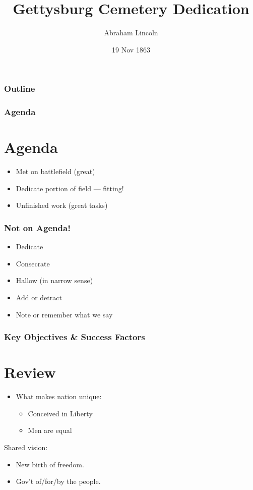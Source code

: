 \documentclass{beamer}
\title{Gettysburg Cemetery Dedication}
\author{Abraham Lincoln}
\institute{United States of America}
\date{19 Nov 1863}
\begin{document}
\begin{frame}
\maketitle
\end{frame}

\begin{frame}
\frametitle{Outline}
\tableofcontents
\end{frame}


\begin{frame}
\frametitle{Agenda}
\section{Agenda}
\begin{itemize}
\item Met on battlefield (great)
\item Dedicate portion of field --- fitting!
\item Unfinished work (great tasks)
\end{itemize}
\end{frame}



\begin{frame}
\frametitle{Not on Agenda!}
\begin{itemize}
\item Dedicate
\item \pause Consecrate
\item \pause Hallow (in narrow sense)
\item \pause Add or detract
\item\pause  Note or remember what we say
\end{itemize}
\end{frame}



\begin{frame}
\frametitle{Key Objectives \& Success Factors}
\section{Review}
\begin{itemize}
\item What makes nation unique:
	\begin{itemize}
	\item Conceived in Liberty
	\item Men are equal
	\end{itemize}
\end{itemize}

\begin{block}{Shared vision:}
\begin{itemize}
\item New birth of freedom.
\item Gov't of/for/by the people.
\end{itemize}
\end{block}
\end{frame}
\end{document}
